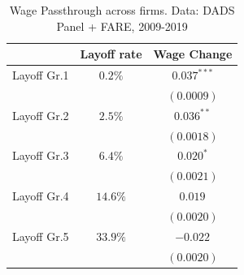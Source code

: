 \begin{table} 
  \centering
  \begin{tabular}{lcc}
    \hline
    & \multicolumn{1}{c}{Layoff rate} & \multicolumn{1}{c}{Wage Change} \\   
    \hline
    \vspace{-4pt} 
    Layoff Gr.1     & $0.2\%$  &  $0.037^{***}$             \\    \vspace{-4pt} 
                    &    &  $(0.0009)$              \\    \vspace{-4pt} 
    Layoff Gr.2     & $2.5\%$  &  $0.036^{**}$              \\    \vspace{-4pt} 
                    &    &  $(0.0018)$              \\    \vspace{-4pt} 
    Layoff Gr.3    &  $6.4\%$  &  $0.020^{*}$                 \\    \vspace{-4pt} 
                    &    &  $(0.0021)$              \\    \vspace{-4pt} 
    Layoff Gr.4     & $14.6\%$  &  $0.019^{}$                \\    \vspace{-4pt} 
                    &    &  $(0.0020)$              \\                       
    Layoff Gr.5     & $33.9\%$  &  $-0.022^{}$                \\    \vspace{-4pt} 
                    &    &  $(0.0020)$              \\      
    \hline
  \end{tabular}
  \caption{Wage Passthrough across firms. Data: DADS Panel + FARE, 2009-2019}
  \label{tab:acrossfirms}
\end{table}


